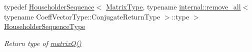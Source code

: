 \begin{DoxyCompactItemize}
\item 
\mbox{\label{group___eigenvalues___module_af322315c8bea9990152c9d09bfa2a69f}} 
typedef \hyperlink{group___householder___module_class_eigen_1_1_householder_sequence}{Householder\+Sequence}$<$ \hyperlink{group___eigenvalues___module_add0f4b2216d0ea8ee0f7d8525deaf0a9}{Matrix\+Type}, typename \hyperlink{struct_eigen_1_1internal_1_1remove__all}{internal\+::remove\+\_\+all}$<$ typename Coeff\+Vector\+Type\+::\+Conjugate\+Return\+Type $>$\+::type $>$ \hyperlink{group___eigenvalues___module_af322315c8bea9990152c9d09bfa2a69f}{Householder\+Sequence\+Type}
\begin{DoxyCompactList}\small\item\em Return type of \hyperlink{group___eigenvalues___module_a000f7392eda930576ffd2af1fae54af2}{matrix\+Q()} \end{DoxyCompactList}\end{DoxyCompactItemize}
